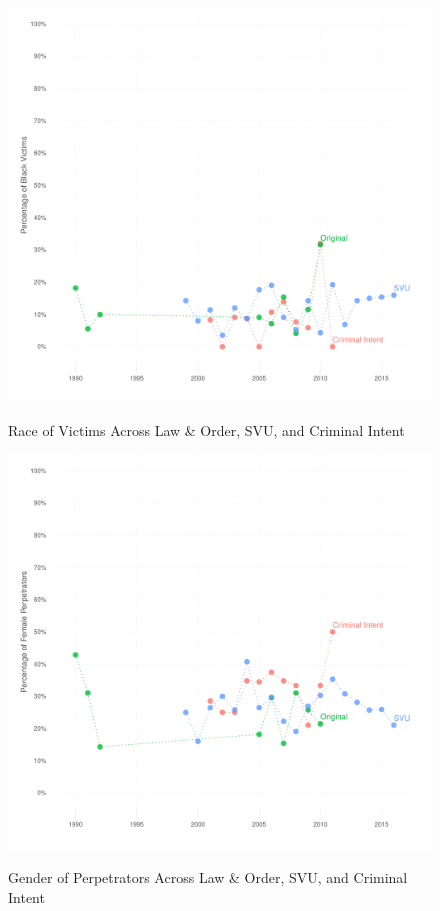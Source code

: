 \documentclass[12pt, letterpaper]{article}
\begin{document}
\begin{figure}[htbp]
\centering
\caption{Race of Victims Across Law \& Order, SVU, and Criminal Intent}
\includegraphics[scale=.9]{../figs/all_victims_by_race_ts.pdf}
\label{fig:victim_race_ts}
\end{figure}

\begin{figure}[htbp]
\centering
\caption{Gender of Perpetrators Across Law \& Order, SVU, and Criminal Intent}
\includegraphics[scale=.9]{../figs/all_criminals_by_gender_ts.pdf}
\label{fig:perp_sex_ts}
\end{figure}
\end{document}
